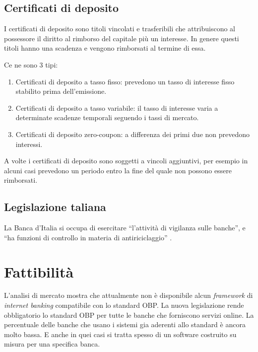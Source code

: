 \documentclass[10pt]{softeng} %
\begin{document}

\subsection{Certificati di deposito}

I certificati di deposito sono titoli vincolati e trasferibili che attribuiscono al possessore il diritto al rimborso del capitale più un interesse.
In genere questi titoli hanno una scadenza e vengono rimborsati al termine di essa.

Ce ne sono 3 tipi:
\begin{enumerate}
    \item Certificati di deposito a tasso fisso: prevedono un tasso di interesse fisso stabilito prima dell'emissione.
    \item Certificati di deposito a tasso variabile: il tasso di interesse varia a determinate scadenze temporali seguendo i tassi di mercato.
    \item Certificati di deposito zero-coupon: a differenza dei primi due non prevedono interessi.
\end{enumerate}

A volte i certificati di deposito sono soggetti a vincoli aggiuntivi, per esempio in alcuni casi prevedono un periodo entro la fine del quale non possono essere rimborsati.

\subsection{Legislazione taliana}

La Banca d'Italia si occupa di esercitare ``l'attivit\`a di vigilanza sulle banche'', e ``ha funzioni di controllo in materia di antiriciclaggio'' \cite[Funzioni]{banca_italia}.


\section{Fattibilit\`a}

L'analisi di mercato mostra che attualmente non \`e disponibile alcun \emph{framework} di \emph{internet banking} compatibile con lo standard OBP.
La nuova legislazione rende obbligatorio lo standard OBP per tutte le banche che forniscono servizi online.
La percentuale delle banche che usano i sistemi gia aderenti allo standard \`e ancora molto bassa.
E anche in quei casi si tratta spesso di un software costruito su misura per una specifica banca.
\end{document}

